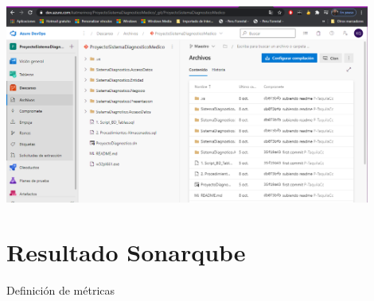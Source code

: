 \documentclass[preprint,12pt]{elsarticle}
\begin{document}
	\begin{center}
	\includegraphics[width=12cm]{./imagen/20} 
	\end{center}

\section{Resultado Sonarqube}
	Definición de métricas
\end{document}
